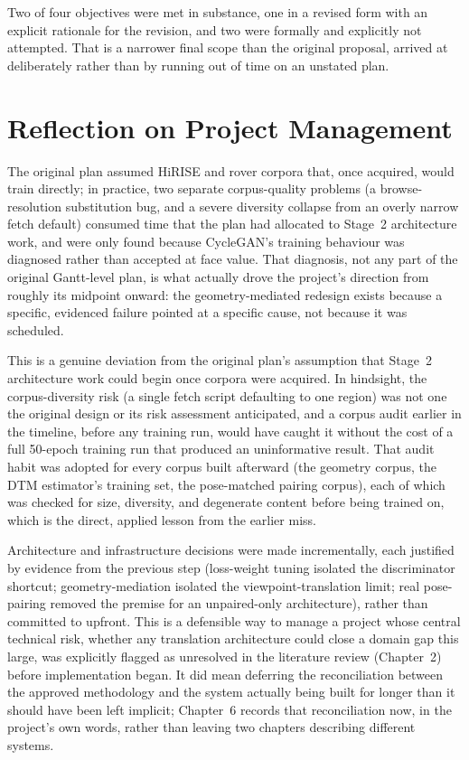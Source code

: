 Two of four objectives were met in substance, one in a revised form with an explicit rationale for the revision, and two were formally and explicitly not attempted. That is a narrower final scope than the original proposal, arrived at deliberately rather than by running out of time on an unstated plan.

\section{Reflection on Project Management}
\label{sec:conclusions-management}

The original plan assumed HiRISE and rover corpora that, once acquired, would train directly; in practice, two separate corpus-quality problems (a browse-resolution substitution bug, and a severe diversity collapse from an overly narrow fetch default) consumed time that the plan had allocated to Stage~2 architecture work, and were only found because CycleGAN's training behaviour was diagnosed rather than accepted at face value. That diagnosis, not any part of the original Gantt-level plan, is what actually drove the project's direction from roughly its midpoint onward: the geometry-mediated redesign exists because a specific, evidenced failure pointed at a specific cause, not because it was scheduled.

This is a genuine deviation from the original plan's assumption that Stage~2 architecture work could begin once corpora were acquired. In hindsight, the corpus-diversity risk (a single fetch script defaulting to one region) was not one the original design or its risk assessment anticipated, and a corpus audit earlier in the timeline, before any training run, would have caught it without the cost of a full 50-epoch training run that produced an uninformative result. That audit habit was adopted for every corpus built afterward (the geometry corpus, the DTM estimator's training set, the pose-matched pairing corpus), each of which was checked for size, diversity, and degenerate content before being trained on, which is the direct, applied lesson from the earlier miss.

Architecture and infrastructure decisions were made incrementally, each justified by evidence from the previous step (loss-weight tuning isolated the discriminator shortcut; geometry-mediation isolated the viewpoint-translation limit; real pose-pairing removed the premise for an unpaired-only architecture), rather than committed to upfront. This is a defensible way to manage a project whose central technical risk, whether any translation architecture could close a domain gap this large, was explicitly flagged as unresolved in the literature review (Chapter~2) before implementation began. It did mean deferring the reconciliation between the approved methodology and the system actually being built for longer than it should have been left implicit; Chapter~6 records that reconciliation now, in the project's own words, rather than leaving two chapters describing different systems.

